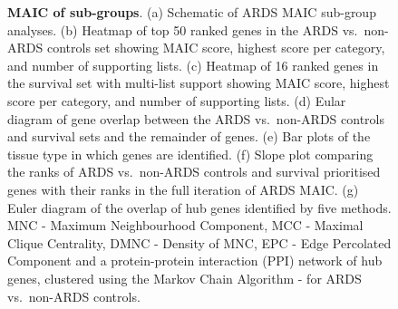 \documentclass[
  11,
  a4paper,
]{article}
\begin{document}
\begin{figure}


\caption{\label{fig-fig3}\textbf{MAIC of sub-groups}. (a) Schematic of
ARDS MAIC sub-group analyses. (b) Heatmap of top 50 ranked genes in the
ARDS vs.~non-ARDS controls set showing MAIC score, highest score per
category, and number of supporting lists. (c) Heatmap of 16 ranked genes
in the survival set with multi-list support showing MAIC score, highest
score per category, and number of supporting lists. (d) Eular diagram of
gene overlap between the ARDS vs.~non-ARDS controls and survival sets
and the remainder of genes. (e) Bar plots of the tissue type in which
genes are identified. (f) Slope plot comparing the ranks of ARDS
vs.~non-ARDS controls and survival prioritised genes with their ranks in
the full iteration of ARDS MAIC. (g) Euler diagram of the overlap of hub
genes identified by five methods. MNC - Maximum Neighbourhood Component,
MCC - Maximal Clique Centrality, DMNC - Density of MNC, EPC - Edge
Percolated Component and a protein-protein interaction (PPI) network of
hub genes, clustered using the Markov Chain Algorithm - for ARDS
vs.~non-ARDS controls.}

\end{figure}%
\end{document}
